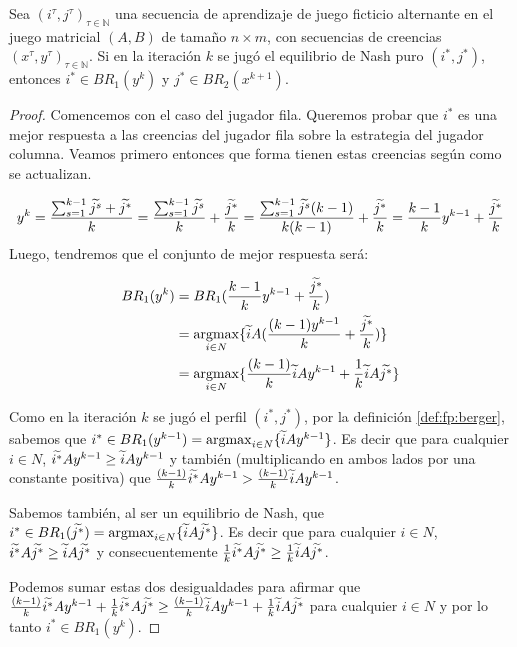 \begin{lemma}
    Sea $(i^\tau, j^\tau)_{\tau \in \mathbb{N}}$ una secuencia de aprendizaje de juego ficticio alternante en el juego matricial $(A, B)$ de tamaño $n \times m$, con secuencias de creencias $(x^\tau, y^\tau)_{\tau \in \mathbb{N}}$. Si en la iteración $k$ se jugó el equilibrio de Nash puro $(i^*, j^*)$, entonces $i^* \in BR_1(y^{k})$ y $j^* \in BR_2(x^{k+1})$.
\end{lemma}
\begin{proof}
    Comencemos con el caso del jugador fila. Queremos probar que $i^*$ es una mejor respuesta a las creencias del jugador fila sobre la estrategia del jugador columna. Veamos primero entonces que forma tienen estas creencias según como se actualizan.
    
    \[
        y^k = \frac{\sum_{s=1}^{k-1}{\widetilde{j^s}} + \widetilde{j^*}}{k}
            = \frac{\sum_{s=1}^{k-1}{\widetilde{j^s}}}{k} + \frac{\widetilde{j^*}}{k}
            = \frac{\sum_{s=1}^{k-1}{\widetilde{j^s}}(k-1)}{k(k-1)} + \frac{\widetilde{j^*}}{k}
            = \frac{k - 1}{k} y^{k-1} + \frac{\widetilde{j^*}}{k}
    \]
    Luego, tendremos que el conjunto de mejor respuesta será:
    
    \begin{align*}
        BR_1(y^k) &= BR_1(\frac{k - 1}{k} y^{k-1} + \frac{ \widetilde{j^*}}{k}) \\
        &= \operatorname*{argmax}_{i \in N} \{\widetilde{i} A(\frac{(k - 1)y^{k-1}}{k} + \frac{ \widetilde{j^*}}{k})\}\\
        &= \operatorname*{argmax}_{i \in N} \{\frac{(k - 1)}{k}\widetilde{i} Ay^{k-1} + \frac{1}{k}\widetilde{i} A \widetilde{j^*}\}
    \end{align*}

    Como en la iteración $k$ se jugó el perfil $(i^*, j^*)$, por la definición \ref{def:fp:berger}, sabemos que $i^* \in BR_1(y^{k-1}) = \operatorname*{argmax}_{i \in N}\{\widetilde{i}Ay^{k-1}\}$. Es decir que para cualquier $i \in N$, $\widetilde{i^*}Ay^{k-1} \geq \widetilde{i}Ay^{k-1}$ y también (multiplicando en ambos lados por una constante positiva) que $\frac{(k - 1)}{k}\widetilde{i^*}Ay^{k-1} > \frac{(k - 1)}{k}\widetilde{i}Ay^{k-1}$.

    Sabemos también, al ser un equilibrio de Nash, que $i^* \in BR_1(\widetilde{j^*}) = \operatorname*{argmax}_{i \in N}\{\widetilde{i} A \widetilde{j^*}\}$. Es decir que para cualquier $i \in N$, $\widetilde{i^*}A \widetilde{j^*} \geq \widetilde{i}A \widetilde{j^*}$ y consecuentemente $\frac{1}{k}\widetilde{i^*}A \widetilde{j^*} \geq \frac{1}{k}\widetilde{i}A \widetilde{j^*}$.

    Podemos sumar estas dos desigualdades para afirmar que $\frac{(k - 1)}{k}\widetilde{i^*}Ay^{k-1} + \frac{1}{k}\widetilde{i^*}A \widetilde{j^*} \geq \frac{(k - 1)}{k}\widetilde{i}Ay^{k-1} + \frac{1}{k}\widetilde{i} A \widetilde{j^*}$ para cualquier $i \in N$ y por lo tanto $i^* \in BR_1(y^{k})$.


\end{proof}
